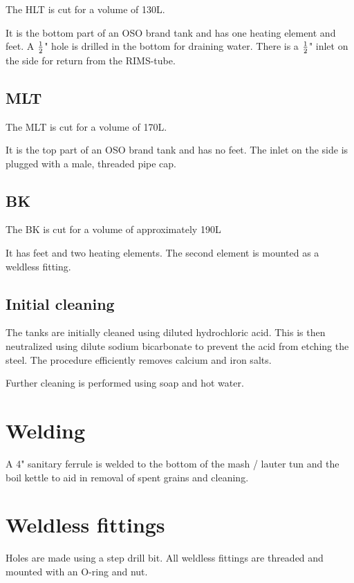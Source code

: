 \documentclass[11pt,fleqn]{book} %
\begin{document}
The HLT is cut for a volume of 130L.

It is the bottom part of an OSO brand tank and has one heating element and feet. A $1 \over 2$" hole is drilled in the bottom for draining water.  There is a $1 \over 2$" inlet on the side for return from the RIMS-tube.

\subsection{MLT}

The MLT is cut for a volume of 170L. 

It is the top part of an OSO brand tank and has no feet. The inlet on the side is plugged with a male, threaded pipe cap.

\subsection{BK}

The BK is cut for a volume of approximately 190L

It has feet and two heating elements. The second element is mounted as a weldless fitting.

\subsection{Initial cleaning}

The tanks are initially cleaned using diluted hydrochloric acid. This is then neutralized using dilute sodium bicarbonate to prevent the acid from etching the steel. The procedure efficiently removes calcium and iron salts.

Further cleaning is performed using soap and hot water.

\section{Welding}

A 4" sanitary ferrule is welded to the bottom of the mash / lauter tun and the boil kettle to aid in removal of spent grains and cleaning.

\section{Weldless fittings}

Holes are made using a step drill bit. All weldless fittings are threaded and mounted with an O-ring and nut.
\end{document}

